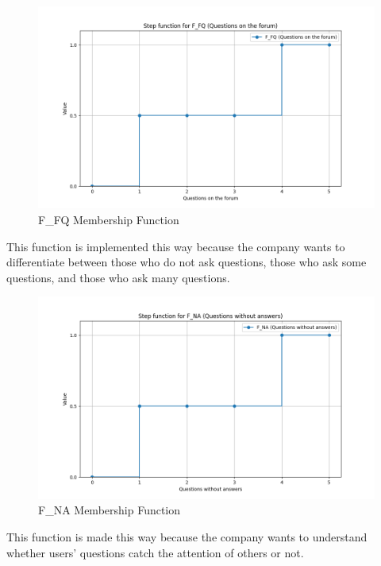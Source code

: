 \begin{figure}[H]
    \centering
    \includegraphics[width=\textwidth]{./assets/plot_F_FQ.png}
    \caption{F\_FQ Membership Function}
    \label{fig:plot_F_FQ}
\end{figure}
This function is implemented this way because the company wants to differentiate between those who do not ask questions, those who ask some questions, and those who ask many questions.

\begin{figure}[H]
    \centering
    \includegraphics[width=\textwidth]{./assets/plot_F_NA.png}
    \caption{F\_NA Membership Function}
    \label{fig:plot_F_NA}
\end{figure}
This function is made this way because the company wants to understand whether users' questions catch the attention of others or not.


